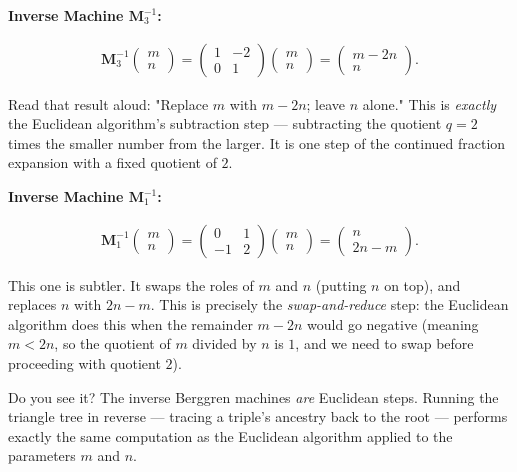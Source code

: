 \documentclass[11pt,twoside,openright]{book}
\theoremstyle{definition}
\theoremstyle{remark}
\begin{document}
\textbf{Inverse Machine $\mathbf{M}_3^{-1}$:}

\begin{align*}
\mathbf{M}_3^{-1} \begin{pmatrix} m \\ n \end{pmatrix} = \begin{pmatrix} 1 & -2 \\ 0 & 1 \end{pmatrix} \begin{pmatrix} m \\ n \end{pmatrix} = \begin{pmatrix} m - 2n \\ n \end{pmatrix}.
\end{align*}

Read that result aloud: "Replace $m$ with $m - 2n$; leave $n$ alone." This is \textit{exactly} the Euclidean algorithm's subtraction step --- subtracting the quotient $q = 2$ times the smaller number from the larger. It is one step of the continued fraction expansion with a fixed quotient of $2$.

\textbf{Inverse Machine $\mathbf{M}_1^{-1}$:}

\begin{align*}
\mathbf{M}_1^{-1} \begin{pmatrix} m \\ n \end{pmatrix} = \begin{pmatrix} 0 & 1 \\ -1 & 2 \end{pmatrix} \begin{pmatrix} m \\ n \end{pmatrix} = \begin{pmatrix} n \\ 2n - m \end{pmatrix}.
\end{align*}

This one is subtler. It swaps the roles of $m$ and $n$ (putting $n$ on top), and replaces $n$ with $2n - m$. This is precisely the \textit{swap-and-reduce} step: the Euclidean algorithm does this when the remainder $m - 2n$ would go negative (meaning $m < 2n$, so the quotient of $m$ divided by $n$ is $1$, and we need to swap before proceeding with quotient $2$).

Do you see it? The inverse Berggren machines \textit{are} Euclidean steps. Running the triangle tree in reverse --- tracing a triple's ancestry back to the root --- performs exactly the same computation as the Euclidean algorithm applied to the parameters $m$ and $n$.
\end{document}
